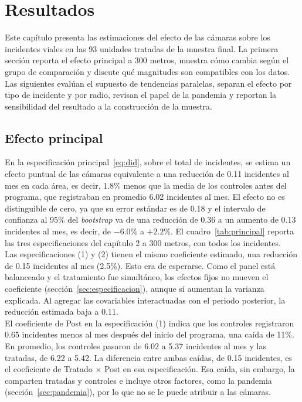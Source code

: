 \chapter{Resultados}
\label{chap:resultados}

\noindent Este capítulo presenta las estimaciones del efecto de las cámaras sobre los incidentes viales en las 93 unidades tratadas de la muestra final. La primera sección reporta el efecto principal a 300 metros, muestra cómo cambia según el grupo de comparación y discute qué magnitudes son compatibles con los datos. Las siguientes evalúan el supuesto de tendencias paralelas, separan el efecto por tipo de incidente y por radio, revisan el papel de la pandemia y reportan la sensibilidad del resultado a la construcción de la muestra.

\section{Efecto principal}
\label{sec:efecto-principal}

\noindent En la especificación principal~\eqref{eq:did}, sobre el total de incidentes, se estima un efecto puntual de las cámaras equivalente a una reducción de 0.11 incidentes al mes en cada área, es decir, 1.8\% menos que la media de los controles antes del programa, que registraban en promedio 6.02 incidentes al mes. El efecto no es distinguible de cero, ya que su error estándar es de 0.18 y el intervalo de confianza al 95\% del \emph{bootstrap} va de una reducción de 0.36 a un aumento de 0.13 incidentes al mes, es decir, de $-6.0\%$ a $+2.2\%$. El cuadro~\ref{tab:principal} reporta las tres especificaciones del capítulo 2 a 300 metros, con todos los incidentes.\\

Las especificaciones (1) y (2) tienen el mismo coeficiente estimado, una reducción de 0.15 incidentes al mes (2.5\%). Esto era de esperarse. Como el panel está balanceado y el tratamiento fue simultáneo, los efectos fijos no mueven el coeficiente (sección~\ref{sec:especificacion}), aunque sí aumentan la varianza explicada. Al agregar las covariables interactuadas con el periodo posterior, la reducción estimada baja a 0.11.\\

El coeficiente de Post en la especificación (1) indica que los controles registraron 0.65 incidentes menos al mes después del inicio del programa, una caída de 11\%. En promedio, los controles pasaron de 6.02 a 5.37 incidentes al mes y las tratadas, de 6.22 a 5.42. La diferencia entre ambas caídas, de 0.15 incidentes, es el coeficiente de Tratado $\times$ Post en esa especificación. Esa caída, sin embargo, la comparten tratadas y controles e incluye otros factores, como la pandemia (sección~\ref{sec:pandemia}), por lo que no se le puede atribuir a las cámaras.

